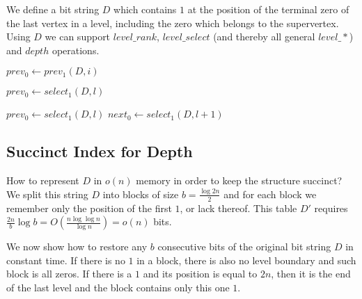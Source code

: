 We define a bit string $D$ which contains $1$ at the position of the terminal zero of the last vertex in a level, including the zero which belongs to the supervertex.
Using $D$ we can support $level\_rank$, $level\_select$ (and thereby all general $level\_*$) and $depth$ operations.

\begin{algorithmic}
	\State $prev_0 \gets prev_1(D, i)$ 
	\State {}
\EndFunction
\end{algorithmic}

\begin{algorithmic}
	\State $prev_0 \gets select_1(D, l)$ 
	\State {}
\EndFunction
\end{algorithmic}

\begin{algorithmic}
	\State $prev_0 \gets select_1(D, l)$ 
	\State $next_0 \gets select_1(D, l + 1)$ 
	\State {}
\EndFunction
\end{algorithmic}

\begin{algorithmic}
	\State {}
\EndFunction
\end{algorithmic}

\subsection{Succinct Index for Depth}

How to represent $D$ in $o(n)$ memory in order to keep the structure succinct?
We split this string $D$ into blocks of size $b = \frac{\log 2n}{2}$ and for each block we remember only the position of the first $1$, or lack thereof.
This table $D'$ requires $\frac{2n}{b} \log b = O(\frac{n \log\log n}{\log n}) = o(n)$ bits.

We now show how to restore any $b$ consecutive bits of the original bit string $D$ in constant time.
If there is no $1$ in a block, there is also no level boundary and such block is all zeros.
If there is a $1$ and its position is equal to $2n$, then it is the end of the last level and the block contains only this one $1$.

